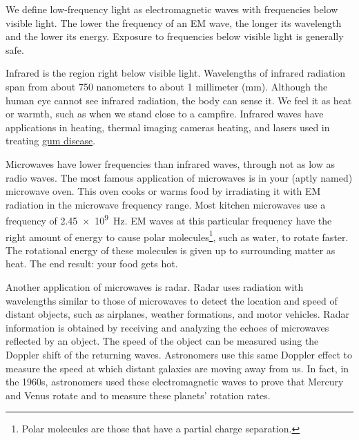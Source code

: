 \documentclass{article}
\numberwithin{equation}{section}
\numberwithin{figure}{section}
\begin{document}
We define low-frequency light as electromagnetic waves with frequencies below visible light. The lower the frequency of an EM wave, the longer its wavelength and the lower its energy. Exposure to frequencies below visible light is generally safe. 

\vspace{1em}

Infrared is the region right below visible light. Wavelengths of infrared radiation span from about 750 nanometers to about 1 millimeter (mm). Although the human eye cannot see infrared radiation, the body can sense it. We feel it as heat or warmth, such as when we stand close to a campfire. Infrared waves have applications in heating, thermal imaging cameras heating, and lasers used in treating \href{https://www.tandfonline.com/doi/full/10.1080/13102818.2018.1544034}{gum disease}. 

\vspace{1em}

Microwaves have lower frequencies than infrared waves, through not as low as radio waves. The most famous application of microwaves is in your (aptly named) microwave oven. This oven cooks or warms food by irradiating it with EM radiation in the microwave frequency range. Most kitchen microwaves use a frequency of \SI{2.45e9}{Hz}. EM waves at this particular frequency have the right amount of energy to cause polar molecules\footnote{Polar molecules are those that have a partial charge separation.}, such as water, to rotate faster. The rotational energy of these molecules is given up to surrounding matter as heat. The end result: your food gets hot.

\vspace{1em}

Another application of microwaves is radar. Radar uses radiation with wavelengths similar to those of microwaves to detect the location and speed of distant objects, such as airplanes, weather formations, and motor vehicles. Radar information is obtained by receiving and analyzing the echoes of microwaves reflected by an object. The speed of the object can be measured using the Doppler shift of the returning waves. Astronomers use this same Doppler effect to measure the speed at which distant galaxies are moving away from us. In fact, in the 1960s, astronomers used these electromagnetic waves to prove that Mercury and Venus rotate and to measure these planets' rotation rates.

\vspace{1em}
\end{document}
